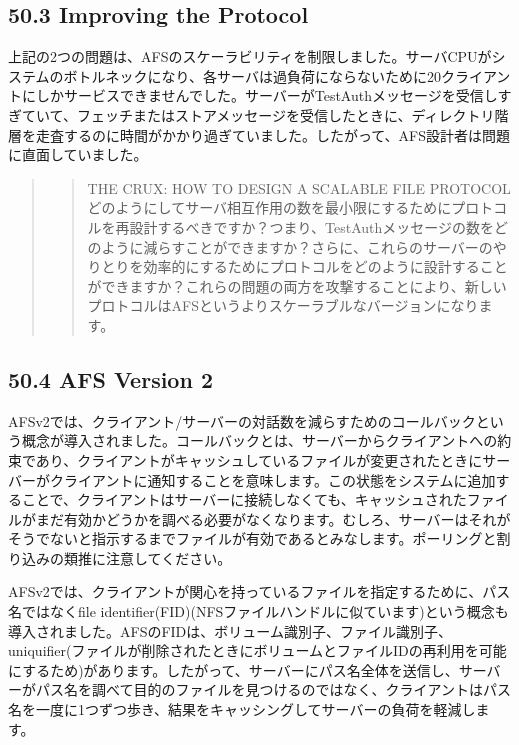\hypertarget{improving-the-protocol}{%
\subsection*{50.3 Improving the Protocol}\label{improving-the-protocol}}

上記の2つの問題は、AFSのスケーラビリティを制限しました。サーバCPUがシステムのボトルネックになり、各サーバは過負荷にならないために20クライアントにしかサービスできませんでした。サーバーがTestAuthメッセージを受信しすぎていて、フェッチまたはストアメッセージを受信したときに、ディレクトリ階層を走査するのに時間がかかり過ぎていました。したがって、AFS設計者は問題に直面していました。

\begin{quote}
\begin{quote}
THE CRUX: HOW TO DESIGN A SCALABLE FILE PROTOCOL\\
どのようにしてサーバ相互作用の数を最小限にするためにプロトコルを再設計するべきですか？つまり、TestAuthメッセージの数をどのように減らすことができますか？さらに、これらのサーバーのやりとりを効率的にするためにプロトコルをどのように設計することができますか？これらの問題の両方を攻撃することにより、新しいプロトコルはAFSというよりスケーラブルなバージョンになります。
\end{quote}
\end{quote}

\hypertarget{afs-version-2}{%
\subsection*{50.4 AFS Version 2}\label{afs-version-2}}

AFSv2では、クライアント/サーバーの対話数を減らすためのコールバックという概念が導入されました。コールバックとは、サーバーからクライアントへの約束であり、クライアントがキャッシュしているファイルが変更されたときにサーバーがクライアントに通知することを意味します。この状態をシステムに追加することで、クライアントはサーバーに接続しなくても、キャッシュされたファイルがまだ有効かどうかを調べる必要がなくなります。むしろ、サーバーはそれがそうでないと指示するまでファイルが有効であるとみなします。ポーリングと割り込みの類推に注意してください。

AFSv2では、クライアントが関心を持っているファイルを指定するために、パス名ではなくfile
identifier(FID)(NFSファイルハンドルに似ています)という概念も導入されました。AFSのFIDは、ボリューム識別子、ファイル識別子、uniquifier(ファイルが削除されたときにボリュームとファイルIDの再利用を可能にするため)があります。したがって、サーバーにパス名全体を送信し、サーバーがパス名を調べて目的のファイルを見つけるのではなく、クライアントはパス名を一度に1つずつ歩き、結果をキャッシングしてサーバーの負荷を軽減します。

